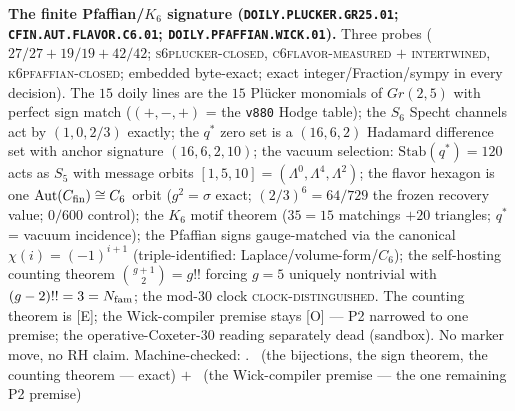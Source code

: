 \par\smallskip\noindent\textbf{The finite Pfaffian/$K_6$
signature (\texttt{DOILY.PLUCKER.\allowbreak GR25.01};
\texttt{CFIN.AUT.\allowbreak FLAVOR.C6.01};
\texttt{DOILY.PFAFFIAN.\allowbreak WICK.01}).}
Three probes ($27/27 + 19/19 + 42/42$;
\textsc{s6plucker-closed}, \textsc{c6flavor-measured} $+$
\textsc{intertwined}, \textsc{k6pfaffian-closed}; embedded
byte-exact; exact integer/Fraction/sympy in every decision).
The $15$ doily lines are the $15$ Pl\"ucker monomials of
$Gr(2,5)$ with perfect sign match ($(+,-,+)$ = the
\texttt{v880} Hodge table); the $S_6$ Specht channels act by
$(1, 0, 2/3)$ exactly; the $q^{*}$ zero set is a $(16, 6, 2)$
Hadamard difference set with anchor signature $(16, 6, 2, 10)$;
the vacuum selection: $\mathrm{Stab}(q^{*}) = 120$ acts as
$S_5$ with message orbits $[1, 5, 10] = (\Lambda^0, \Lambda^4,
\Lambda^2)$; the flavor hexagon is one $\mathrm{Aut}(C_{\rm
fin}) \cong C_6$ orbit ($g^2 = \sigma$ exact; $(2/3)^6 =
64/729$ the frozen recovery value; $0/600$ control); the $K_6$
motif theorem ($35 = 15$ matchings $+ 20$ triangles; $q^{*}$ =
vacuum incidence); the Pfaffian signs gauge-matched via the
canonical $\chi(i) = (-1)^{i+1}$ (triple-identified:
Laplace/volume-form/$C_6$); the self-hosting counting theorem
$\binom{g+1}{2} = g!!$ forcing $g = 5$ uniquely nontrivial with
$(g-2)!! = 3 = N_{\mathrm{fam}}$; the mod-$30$ clock
\textsc{clock-distinguished}.  The counting theorem is [E]; the
Wick-compiler premise stays [O] --- P2 narrowed to one premise;
the operative-Coxeter-$30$ reading separately dead (sandbox).
No marker move, no RH claim.
Machine-checked: .
\mE\ (the bijections, the sign theorem, the counting theorem
--- exact) $+$ \mO\ (the Wick-compiler premise --- the one
remaining P2 premise)
\par\smallskip
